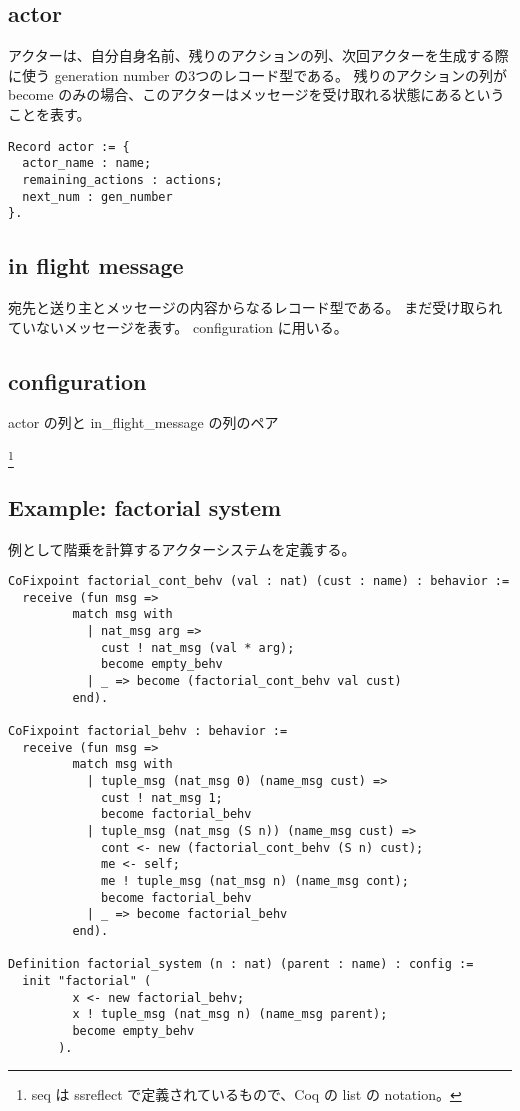 \subsection{actor}
アクターは、自分自身名前、残りのアクションの列、次回アクターを生成する際に使う generation number の3つのレコード型である。
残りのアクションの列が become のみの場合、このアクターはメッセージを受け取れる状態にあるということを表す。

\begin{lstlisting}
Record actor := {
  actor_name : name;
  remaining_actions : actions;
  next_num : gen_number
}.
\end{lstlisting}

\subsection{in flight message}
宛先と送り主とメッセージの内容からなるレコード型である。
まだ受け取られていないメッセージを表す。
configuration に用いる。

\subsection{configuration}
actor の列と in\_flight\_message の列のペア

\footnote{seq は ssreflect で定義されているもので、Coq の list の notation。}

\subsection{Example: factorial system}
例として階乗を計算するアクターシステムを定義する。

\begin{lstlisting}
CoFixpoint factorial_cont_behv (val : nat) (cust : name) : behavior :=
  receive (fun msg =>
         match msg with
           | nat_msg arg =>
             cust ! nat_msg (val * arg);
             become empty_behv
           | _ => become (factorial_cont_behv val cust)
         end).

CoFixpoint factorial_behv : behavior :=
  receive (fun msg =>
         match msg with
           | tuple_msg (nat_msg 0) (name_msg cust) =>
             cust ! nat_msg 1;
             become factorial_behv
           | tuple_msg (nat_msg (S n)) (name_msg cust) =>
             cont <- new (factorial_cont_behv (S n) cust);
             me <- self;
             me ! tuple_msg (nat_msg n) (name_msg cont);
             become factorial_behv
           | _ => become factorial_behv
         end).

Definition factorial_system (n : nat) (parent : name) : config :=
  init "factorial" (
         x <- new factorial_behv;
         x ! tuple_msg (nat_msg n) (name_msg parent);
         become empty_behv
       ).
\end{lstlisting}
